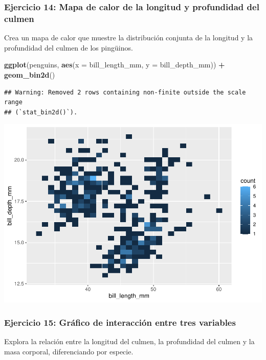 \documentclass[
]{book}
\newenvironment{Shaded}{\begin{snugshade}}{\end{snugshade}}
\newcommand{\AttributeTok}[1]{\textcolor[rgb]{0.13,0.29,0.53}{#1}}
\newcommand{\FunctionTok}[1]{\textcolor[rgb]{0.13,0.29,0.53}{\textbf{#1}}}
\newcommand{\NormalTok}[1]{#1}
\newcommand{\SpecialCharTok}[1]{\textcolor[rgb]{0.81,0.36,0.00}{\textbf{#1}}}
\begin{document}
\subsubsection{Ejercicio 14: Mapa de calor de la longitud y profundidad del culmen}\label{ejercicio-14-mapa-de-calor-de-la-longitud-y-profundidad-del-culmen}

Crea un mapa de calor que muestre la distribución conjunta de la longitud y la profundidad del culmen de los pingüinos.

\begin{Shaded}
\begin{Highlighting}[]
\FunctionTok{ggplot}\NormalTok{(penguins, }\FunctionTok{aes}\NormalTok{(}\AttributeTok{x =}\NormalTok{ bill\_length\_mm, }\AttributeTok{y =}\NormalTok{ bill\_depth\_mm)) }\SpecialCharTok{+}
  \FunctionTok{geom\_bin2d}\NormalTok{()}
\end{Highlighting}
\end{Shaded}

\begin{verbatim}
## Warning: Removed 2 rows containing non-finite outside the scale range
## (`stat_bin2d()`).
\end{verbatim}

\includegraphics{bookdown-demo_files/figure-latex/unnamed-chunk-194-1.pdf}

\subsubsection{Ejercicio 15: Gráfico de interacción entre tres variables}\label{ejercicio-15-gruxe1fico-de-interacciuxf3n-entre-tres-variables}

Explora la relación entre la longitud del culmen, la profundidad del culmen y la masa corporal, diferenciando por especie.
\end{document}

